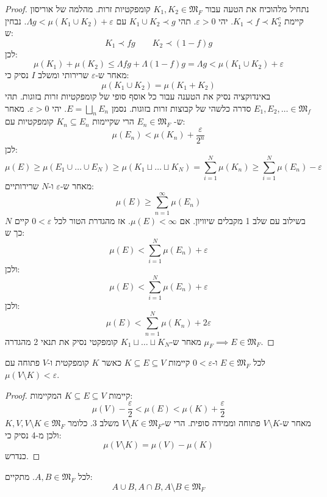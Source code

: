 \documentclass{tstextbook}
\begin{document}
\begin{proof}
נתחיל מלהוכיח את הטעה עבור \(K_{1},K_{2} \in \mathfrak{ M}_{F}\) קומפקטיות זרות. מהלמה של אוריסון קיימת \(K_{1}\prec f\prec K_{2}^{c}\). יהי \(\varepsilon> 0\). תהי \(K_{1}\cup K_{2}\prec g\) עם \(\Lambda g <\mu\left( K_{1}\cup K_{2} \right)+\varepsilon\). נבחין ש:
$$K_{1}\prec fg \qquad  K_{2}\prec (1-f)g$$
לכן:
$$\mu(K_{1})+\mu(K_{2})\leq \Lambda fg + \Lambda(1-f)g = \Lambda g <\mu\left( K_{1} \cup K_{2} \right)+\varepsilon$$
מאחר ש-\(\varepsilon\) שרירותי ומשלב \(I\) נסיק כי:
$$\mu\left( K_{1} \cup K_{2} \right)= \mu(K_{1}+K_{2})$$
באינדוקציה נסיק את הטענה עבור כל אוסף סופי של קומפקטיות זרות בזוגות. תהי \(E_{1},E_{2},\dots \in \mathfrak{M}_{f}\) סדרה כלשהי של קבוצות זרות בזוגות. נסמן \(E=\bigsqcup_{n} E_{n}\). יהי \(\varepsilon>0\). מאחר ש- \(E_{n} \in \mathfrak{M}_{F}\) הרי שקיימות \(K_{n}\subseteq E_{n}\) קומפקטיות עם:
$$\mu(E_{n})<\mu(K_{n})+\frac{\varepsilon}{2^{n}}$$
לכן:
$$\mu(E)\geq \mu\left( E_{1} \cup \dots \cup E_{N} \right)\geq \mu\left( K_{1} \sqcup \dots \sqcup K_{N} \right) = \sum_{i=1}^{N} \mu(K_{n})\geq \sum_{i=1}^{N} \mu(E_{n})-\varepsilon$$
מאחר ש-\(\varepsilon\) ו-\(N\) שרירותיים:
$$\mu(E)\geq \sum_{n=1}^{\infty} \mu(E_{n})$$
בשילוב עם שלב 1 מקבלים שיוויון. אם \(\mu(E)<\infty\). אז מהגדרת הטור לכל \(0<\varepsilon\) קיים \(N\) כך ש:
$$\mu(E)<\sum_{i=1}^{N} \mu(E_{n})+\varepsilon$$
ולכן:
$$\mu(E)< \sum_{i=1}^{N} \mu(E_{n})+\varepsilon$$
ולכן:
$$\mu(E)<\sum_{n=1}^{N} \mu(K_{n})+2\varepsilon$$
מאחר ש-\(K_{1}\sqcup \dots \sqcup K_{N}\) קומפקטי נסיק את תנאי 2 מהגדרה \(\mu_{F}\implies E \in \mathfrak{M}_{F}\).

\end{proof}
\begin{lemma}[שלב 5]
לכל \(E \in \mathfrak{M}_{F}\) ו-\(0<\varepsilon\) קיימות \(K\subseteq E \subseteq V\) כאשר \(K\) קומפקטית ו-\(V\) פתוחה עם \(\mu\left( V\setminus K \right)< \varepsilon\).

\end{lemma}
\begin{proof}
קיימות \(K\subseteq E \subseteq V\) המקיימות:
$$\mu(V)-\frac{\varepsilon}{2}< \mu(E) < \mu(K)+\frac{\varepsilon}{2}$$
מאחר ש-\(V \setminus K\) פתוחה וממידה סופית. הרי ש-\(V \setminus K \in \mathfrak{M}_{F}\) משלב 3. כלומר \(K,V, V\setminus K \in \mathfrak{M}_{F}\) ולכן מ-4 נסיק כי:
$$\mu\left( V \setminus  K \right)= \mu(V)-\mu(K)$$
כנדרש.

\end{proof}
\begin{lemma}[שלב 6]
לכל \(A,B \in \mathfrak{M}_{F}\). מתקיים:
$$A\cup B, A\cap B , A \setminus  B \in \mathfrak{M} _{F}$$

\end{lemma}
\end{document}
